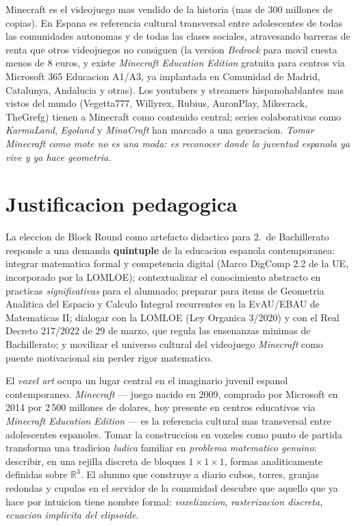 \documentclass[12pt,a4paper]{scrartcl}
\newcommand{\acc}[1]{\textcolor{accent}{\textbf{#1}}}
\begin{document}
\begin{minecraft}
Minecraft es el videojuego mas vendido de la historia (mas de 300 millones de copias). En Espana es referencia cultural transversal entre adolescentes de todas las comunidades autonomas y de todas las clases sociales, atravesando barreras de renta que otros videojuegos no consiguen (la version \emph{Bedrock} para movil cuesta menos de 8 euros, y existe \emph{Minecraft Education Edition} gratuita para centros via Microsoft 365 Educacion A1/A3, ya implantada en Comunidad de Madrid, Catalunya, Andalucia y otras). Los youtubers y streamers hispanohablantes mas vistos del mundo (Vegetta777, Willyrex, Rubius, AuronPlay, Mikecrack, TheGrefg) tienen a Minecraft como contenido central; series colaborativas como \emph{KarmaLand}, \emph{Egoland} y \emph{MinaCraft} han marcado a una generacion. \emph{Tomar Minecraft como mote no es una moda: es reconocer donde la juventud espanola ya vive y ya hace geometria.}
\end{minecraft}

\section{Justificacion pedagogica}\label{sec:justificativa}

La eleccion de Block Round como artefacto didactico para 2.\textordmasculine\ de Bachillerato responde a una demanda \acc{quintuple} de la educacion espanola contemporanea: integrar matematica formal y competencia digital (Marco DigComp 2.2 de la UE, incorporado por la LOMLOE); contextualizar el conocimiento abstracto en practicas \emph{significativas} para el alumnado; preparar para items de Geometria Analitica del Espacio y Calculo Integral recurrentes en la EvAU/EBAU de Matematicas II; dialogar con la LOMLOE (Ley Organica 3/2020) y con el Real Decreto 217/2022 de 29 de marzo, que regula las ensenanzas minimas de Bachillerato; y movilizar el universo cultural del videojuego \emph{Minecraft} como puente motivacional sin perder rigor matematico.

El \emph{voxel art} ocupa un lugar central en el imaginario juvenil espanol contemporaneo. \emph{Minecraft} --- juego nacido en 2009, comprado por Microsoft en 2014 por 2\,500 millones de dolares, hoy presente en centros educativos via \emph{Minecraft Education Edition} --- es la referencia cultural mas transversal entre adolescentes espanoles. Tomar la construccion en voxeles como punto de partida transforma una tradicion \emph{ludica} familiar en \emph{problema matematico genuino}: describir, en una rejilla discreta de bloques $1\times1\times1$, formas analiticamente definidas sobre $\mathbb{R}^3$. El alumno que construye a diario cubos, torres, granjas redondas y cupulas en el servidor de la comunidad descubre que aquello que ya hace por intuicion tiene nombre formal: \emph{voxelizacion}, \emph{rasterizacion discreta}, \emph{ecuacion implicita del elipsoide}.
\end{document}
